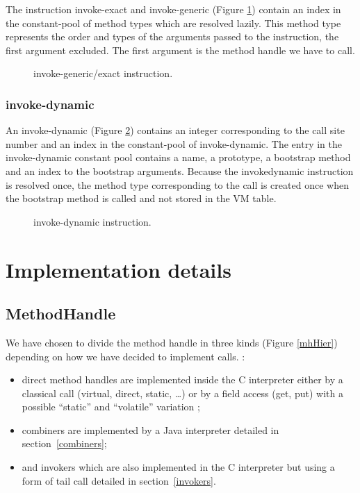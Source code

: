 \documentclass{sig-alternate}
\begin{document}
      The instruction invoke-exact and invoke-generic (Figure \ref{INGEins}) contain an index
      in the constant-pool of method types which are resolved lazily.
      This method type represents the order and types of the arguments passed to the instruction, the first argument excluded.
      The first argument is the method handle we have to call.\\

      \begin{figure}[!h]
        \centering \resizebox{.9\linewidth}{!}{}
        \caption{invoke-generic/exact instruction.}\vspace{-1em}
        \label{INGEins}
      \end{figure}

    \subsubsection{invoke-dynamic}

      An invoke-dynamic (Figure \ref{INDYins}) contains an integer corresponding to the call site number
      and an index in the constant-pool of invoke-dynamic.
      The entry in the invoke-dynamic constant pool contains a name, a prototype, a bootstrap method and an index to
      the bootstrap arguments. 
      Because the invokedynamic instruction is resolved once, the method type corresponding to the call
      is created once when the bootstrap method is called and not stored in the VM table.

      \begin{figure}[!h]
        \centering \resizebox{.9\linewidth}{!}{}
        \caption{invoke-dynamic instruction.}\vspace{-1em}
        \label{INDYins}
      \end{figure}

\section{Implementation details}
\label{implD}

    \subsection{MethodHandle}
      We have chosen to divide the method handle in three kinds (Figure \ref{mhHier})
      depending on how we have decided to implement calls.
      :
      \begin{itemize}
        \item direct method handles are implemented inside the C interpreter
              either by a classical call (virtual, direct, static, \dots)
              or by a field access (get, put) with a possible ``static'' and ``volatile'' variation ;
        \item combiners are implemented by a Java interpreter detailed in section~\ref{combiners};
        \item and invokers which are also implemented in the C interpreter but using a form of tail call
              detailed in section~\ref{invokers}.
      \end{itemize}
\end{document}
